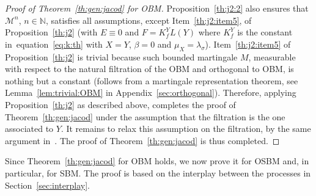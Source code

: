 \documentclass[12pt]{article}
\numberwithin{equation}{section}
\theoremstyle{definition}
\theoremstyle{remark}
\newcommand{\NN}{\mathbb{N}}
\begin{document}
\begin{proof}[Proof of Theorem~\ref{th:gen:jacod} for OBM]
Proposition~\ref{th:j2:2} 
also ensures that
$\mathcal{M}^n$, $n\in \NN$, satisfies all assumptions, except Item~\ref{th:j2:item5}, of Proposition~\ref{th:j2} 
(with %
$E\equiv 0$ %
and
$
	F = K_f^Y L(Y)
$
where $K_f^Y$ is the constant in~equation~\eqref{eq:k:th} with $X=Y$, $\beta=0$ and $\mu_X=\lambda_\sigma$).
Item~\ref{th:j2:item5} of Proposition~\ref{th:j2} is trivial because such bounded martingale $M$, measurable with respect to the natural filtration of the OBM and orthogonal to OBM, is nothing but a constant (follows from a martingale representation theorem, see Lemma~\ref{lem:trivial:OBM} in Appendix~\ref{sec:orthogonal}). 
Therefore, applying Proposition~\ref{th:j2} as described above, completes the proof of Theorem~\ref{th:gen:jacod} under the assumption that the filtration is the one associated to $Y$.
It remains to relax this assumption on the filtration, by the same argument in~\cite[Section 2.2]{j1}.
The proof of Theorem~\ref{th:gen:jacod} is thus completed.
\end{proof}




Since Theorem~\ref{th:gen:jacod} for OBM holds, we now prove it for OSBM and, in particular, for SBM.
The proof is based on the interplay between the processes in Section~\ref{sec:interplay}.
\end{document}
